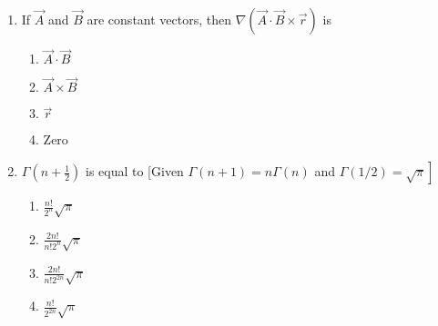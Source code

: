 \documentclass[journal]{IEEEtran}
\begin{document}
\begin{enumerate}
    

 
    \item If $\vec{A}$ and $\vec{B}$ are constant vectors, then $\nabla(\vec{A} \cdot \vec{B} \times \vec{r})$ is
   
   \begin{multicols}{4}
			\begin{enumerate}

\item $\vec{A} \cdot \vec{B}$
\item  $\vec{A} \times \vec{B}$
\item $\vec{r}$

\item Zero

        \end{enumerate}
		\end{multicols}
  \item  $\Gamma(n+\frac{1}{2})$ is equal to [Given $\Gamma(n+1)=n \Gamma(n)$ and $\left.\Gamma(1 / 2)=\sqrt{\pi}\right]$
   \begin{multicols}{4}
			\begin{enumerate}
\item  $\frac{n!}{2^{n}} \sqrt{\pi}$
\item $\frac{2 n!}{n!2^{n}} \sqrt{\pi}$
\item $\frac{2 n!}{n!2^{2 n}} \sqrt{\pi}$
\item $\frac{n!}{2^{2 n}} \sqrt{\pi}$

  \end{enumerate}
		\end{multicols}
  

\end{enumerate}
\end{document}
